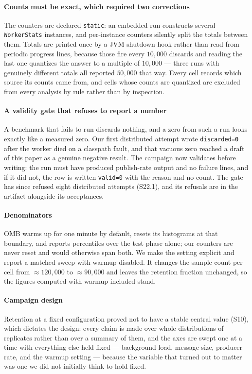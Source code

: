 \documentclass[10pt,journal,onecolumn]{IEEEtran}
\begin{document}
\paragraph{Counts must be exact, which required two corrections} The counters are declared
\texttt{static}: an embedded run constructs several \texttt{WorkerStats} instances, and
per-instance counters silently split the totals between them. Totals are printed once by a JVM
shutdown hook rather than read from periodic progress lines, because those fire every $10{,}000$
discards and reading the last one quantizes the answer to a multiple of $10{,}000$ --- three runs
with genuinely different totals all reported $50{,}000$ that way. Every cell records which source
its counts came from, and cells whose counts are quantized are excluded from every analysis by
rule rather than by inspection.

\paragraph{A validity gate that refuses to report a number} A benchmark that fails to run
discards nothing, and a zero from such a run looks exactly like a measured zero. Our first
distributed attempt wrote \texttt{discarded=0} after the worker died on a classpath fault, and
that vacuous zero reached a draft of this paper as a genuine negative result. The campaign now
validates before writing: the run must have produced publish-rate output and no failure lines, and
if it did not, the row is written \texttt{valid=0} with the reason and no count. The gate has
since refused eight distributed attempts (S22.1), and its refusals are in the
artifact alongside its acceptances.

\paragraph{Denominators} OMB warms up for one minute by default, resets its histograms at that
boundary, and reports percentiles over the test phase alone; our counters are never reset and
would otherwise span both. We make the setting explicit and report a matched sweep with warmup
disabled. It changes the sample count per cell from $\approx120{,}000$ to $\approx90{,}000$ and
leaves the retention fraction unchanged, so the figures computed with warmup included stand.

\paragraph{Campaign design} Retention at a fixed configuration proved not to have a stable central value (S10), which dictates the design: every claim is made over
whole distributions of replicates rather than over a summary of them, and the axes are swept one
at a time with everything else held fixed --- background load, message size, producer rate, and
the warmup setting --- because the variable that turned out to matter was one we did not initially
think to hold fixed.
\end{document}

